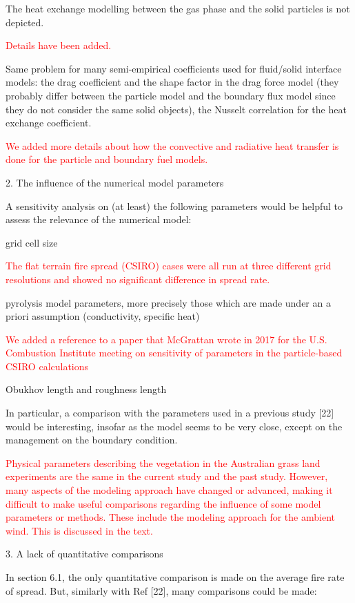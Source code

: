 \documentclass[12pt]{article}
\newcommand\hl[1]{\textcolor{red}{#1}}
\begin{document}
The heat exchange modelling between the gas phase and the solid particles is not depicted.

\hl{Details have been added.}

Same problem for many semi-empirical coefficients used for fluid/solid interface models: the
drag coefficient and the shape factor in the drag force model (they probably differ between the
particle model and the boundary flux model since they do not consider the same solid objects),
the Nusselt correlation for the heat exchange coefficient.

\hl{We added more details about how the convective and radiative heat transfer is done for the particle and boundary fuel models.}


2. The influence of the numerical model parameters

A sensitivity analysis on (at least) the following parameters would be helpful to assess the
relevance of the numerical model:

grid cell size

\hl{The flat terrain fire spread (CSIRO) cases were all run at three different grid resolutions and showed no significant difference in spread rate. }

pyrolysis model parameters, more precisely those which are made under an a priori assumption
(conductivity, specific heat)

\hl{We added a reference to a paper that McGrattan wrote in 2017 for the U.S. Combustion Institute meeting on sensitivity of parameters in the particle-based CSIRO calculations}

Obukhov length and roughness length

In particular, a comparison with the parameters used in a previous study [22] would be
interesting, insofar as the model seems to be very close, except on the management on the
boundary condition.

\hl{Physical parameters describing the vegetation in the Australian grass land experiments are the same in the current study and the past study. However, many aspects of the modeling approach have changed or advanced, making it difficult to make useful comparisons regarding the influence of some model parameters or methods. These include the modeling approach for the ambient wind. This is discussed in the text.}


3. A lack of quantitative comparisons

In section 6.1, the only quantitative comparison is made on the average fire rate of spread. But,
similarly with Ref [22], many comparisons could be made:
\end{document}
